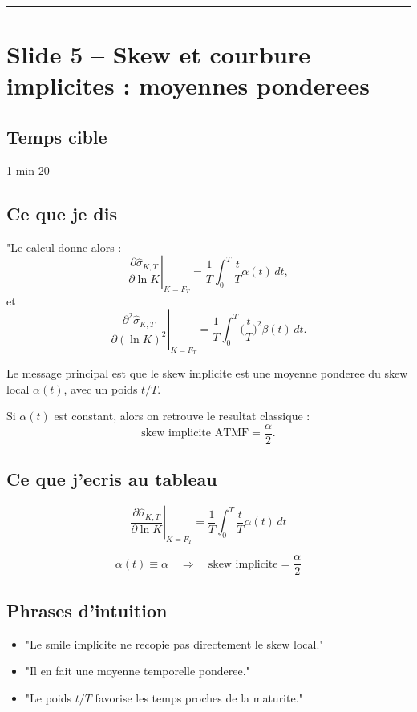 \documentclass[11pt,a4paper]{article}
\begin{document}
\bigskip\hrule\bigskip

\section{Slide 5 -- Skew et courbure implicites : moyennes ponderees}

\subsection{Temps cible}
1 min 20

\subsection{Ce que je dis}

"Le calcul donne alors :
\[
\left.\frac{\partial \hat{\sigma}_{K,T}}{\partial \ln K}\right|_{K=F_T}
=
\frac{1}{T}\int_0^T \frac{t}{T}\alpha(t)\,dt,
\]
et
\[
\left.\frac{\partial^2 \hat{\sigma}_{K,T}}{\partial (\ln K)^2}\right|_{K=F_T}
=
\frac{1}{T}\int_0^T \Big(\frac{t}{T}\Big)^2\beta(t)\,dt.
\]

Le message principal est que le skew implicite est une moyenne ponderee du skew local \(\alpha(t)\), avec un poids \(t/T\).

Si \(\alpha(t)\) est constant, alors on retrouve le resultat classique :
\[
\text{skew implicite ATMF}=\frac{\alpha}{2}.
\]

\subsection{Ce que j'ecris au tableau}

\[
\left.\frac{\partial \hat{\sigma}_{K,T}}{\partial \ln K}\right|_{K=F_T}
=
\frac{1}{T}\int_0^T \frac{t}{T}\alpha(t)\,dt
\]

\[
\alpha(t)\equiv\alpha
\quad\Longrightarrow\quad
\text{skew implicite}=\frac{\alpha}{2}
\]

\subsection{Phrases d'intuition}

\begin{itemize}
\item "Le smile implicite ne recopie pas directement le skew local."
\item "Il en fait une moyenne temporelle ponderee."
\item "Le poids \(t/T\) favorise les temps proches de la maturite."
\end{itemize}
\end{document}
